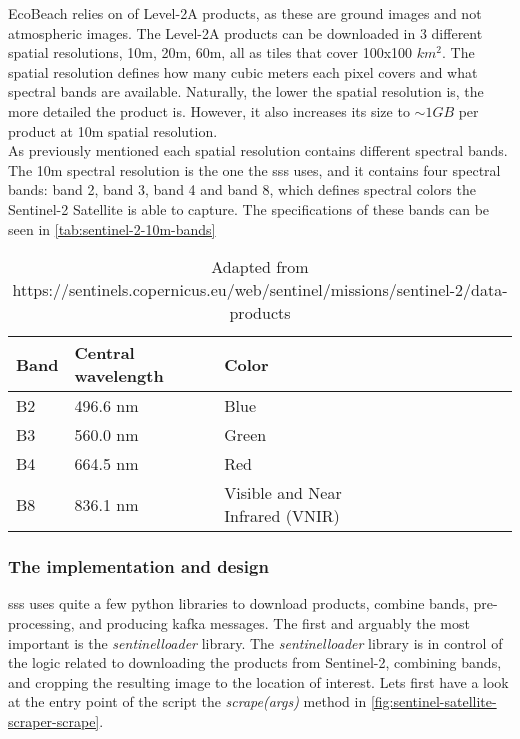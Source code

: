 EcoBeach relies on of Level-2A products, as these are ground images and not atmospheric images. The Level-2A products can be downloaded in 3 different spatial resolutions, 10m, 20m, 60m, all as tiles that cover 100x100 $km^2$. The spatial resolution defines how many cubic meters each pixel covers and what spectral bands are available. Naturally, the lower the spatial resolution is, the more detailed the product is. However, it also increases its size to $\sim 1GB$ per product at 10m spatial resolution. \\

As previously mentioned each spatial resolution contains different spectral bands. The 10m spectral resolution is the one the \acrshort{sss} uses, and it contains four spectral bands: band 2, band 3, band 4 and band 8, which defines spectral colors the Sentinel-2 Satellite is able to capture. The specifications of these bands can be seen in \autoref{tab:sentinel-2-10m-bands}

\begin{table}[h!]
    \centering
    \begin{tabular}{| p{0.1\linewidth} | p{0.3\linewidth} | p{0.3\linewidth} | p{0.3\linewidth} |}
        \hline
        \textbf{Band} & \textbf{Central wavelength} & \textbf{Color}                   \\ \hline
        B2            & 496.6 nm                    & Blue                             \\ \hline
        B3            & 560.0 nm                    & Green                            \\ \hline
        B4            & 664.5 nm                    & Red                              \\ \hline
        B8            & 836.1 nm                    & Visible and Near Infrared (VNIR) \\ \hline
    \end{tabular}
    \caption{Adapted from https://sentinels.copernicus.eu/web/sentinel/missions/sentinel-2/data-products}
    \label{tab:sentinel-2-10m-bands}
\end{table}

\subsubsection{The implementation and design}

\acrshort{sss} uses quite a few python libraries to download products, combine bands, pre-processing, and producing kafka messages. The first and arguably the most important is the \emph{sentinelloader} library. The \emph{sentinelloader} library is in control of the logic related to downloading the products from Sentinel-2, combining bands, and cropping the resulting image to the location of interest. Lets first have a look at the entry point of the script the \emph{scrape(args)} method in \autoref{fig:sentinel-satellite-scraper-scrape}.

